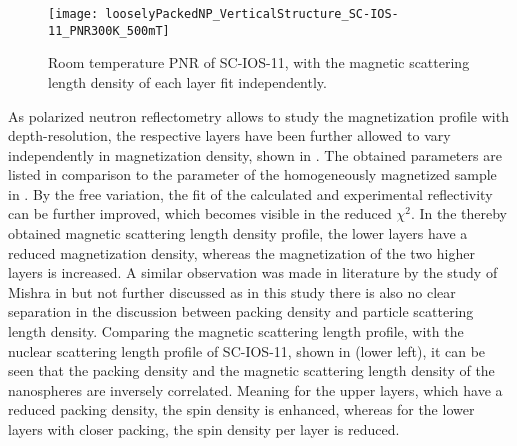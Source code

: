\documentclass[\main/dresen_thesis.tex]{subfiles}
\begin{document}
  \begin{figure}[tb]
    \centering
    \texttt{[image: looselyPackedNP\_VerticalStructure\_SC-IOS-11\_PNR300K\_500mT]}
    \caption{\label{fig:looselyPackedNP:layer:pnrRoomTemperatureMagnetic}Room temperature PNR of SC-IOS-11, with the magnetic scattering length density of each layer fit independently.}
  \end{figure}
  As polarized neutron reflectometry allows to study the magnetization profile with depth-resolution, the respective layers have been further allowed to vary independently in magnetization density, shown in .
  The obtained parameters are listed in comparison to the parameter of the homogeneously magnetized sample in .
  By the free variation, the fit of the calculated and experimental reflectivity can be further improved, which becomes visible in the reduced $\chi^2$.
  In the thereby obtained magnetic scattering length density profile, the lower layers have a reduced magnetization density, whereas the magnetization of the two higher layers is increased.
  A similar observation was made in literature by the study of Mishra \etal in \cite{Mishra_2012_Selfa} but not further discussed as in this study there is also no clear separation in the discussion between packing density and particle scattering length density.
  Comparing the magnetic scattering length profile, with the nuclear scattering length profile of SC-IOS-11, shown in  (lower left), it can be seen that the packing density and the magnetic scattering length density of the nanospheres are inversely correlated.
  Meaning for the upper layers, which have a reduced packing density, the spin density is enhanced, whereas for the lower layers with closer packing, the spin density per layer is reduced.
\end{document}
